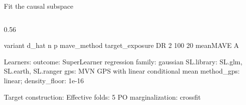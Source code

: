 \documentclass[
  ignorenonframetext,
  aspectratio=169,
  11pt]{beamer}
\newenvironment{Shaded}{\begin{snugshade}}{\end{snugshade}}
\newcommand{\NormalTok}[1]{\textcolor[rgb]{0.00,0.23,0.31}{#1}}
\begin{document}
\begin{frame}[fragile,t]{Fit the causal subspace}
\begin{columns}[T]
\begin{column}{0.56\linewidth}
\begin{Shaded}
\begin{Highlighting}[]
\NormalTok{ variant d\_hat  n p mave\_method target\_exposure}
\NormalTok{      DR     2 100 20   meanMAVE               A}

\NormalTok{Learners:}
\NormalTok{ outcome: SuperLearner regression}
\NormalTok{   family: gaussian}
\NormalTok{   SL.library: SL.glm, SL.earth, SL.ranger}
\NormalTok{ gps: MVN GPS with linear conditional mean}
\NormalTok{   method\_gps: linear; density\_floor: 1e{-}16}

\NormalTok{Target construction:}
\NormalTok{Effective folds: 5}
\NormalTok{PO marginalization: crossfit}
\end{Highlighting}
\end{Shaded}
\end{column}
\end{columns}
\end{frame}
\end{document}

